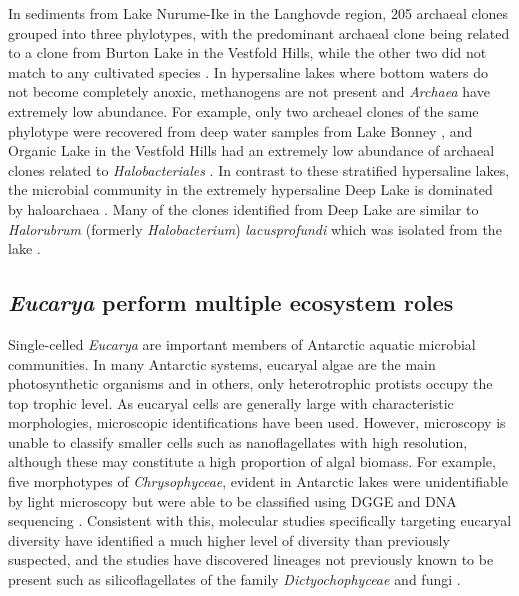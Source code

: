 In sediments from Lake Nurume-Ike in the Langhovde region, 205 archaeal clones grouped into three phylotypes, 
with the predominant archaeal clone being related to a clone from Burton Lake in the Vestfold Hills, while the other two did not match to any cultivated species \cite{Kurosawa2010}. 
In hypersaline lakes where bottom waters do not become completely anoxic, methanogens are not present and \emph{Archaea} have extremely low abundance. 
For example, only two archeael clones of the same phylotype were recovered from deep water samples from Lake Bonney \cite{Glatz2006}, 
and Organic Lake in the Vestfold Hills had an extremely low abundance of archaeal clones related to \emph{Halobacteriales} \cite{Bowman2000b}. 
In contrast to these stratified hypersaline lakes, the microbial community in the extremely hypersaline Deep Lake is dominated by haloarchaea \cite{Bowman2000b}. 
Many of the clones identified from Deep Lake are similar to \emph{Halorubrum} (formerly \emph{Halobacterium}) \emph{lacusprofundi} which was isolated from the lake \cite{Franzmann1988}. 


\subsection{\emph{Eucarya} perform multiple ecosystem roles}

Single-celled \emph{Eucarya} are important members of Antarctic aquatic microbial communities.
In many Antarctic systems, eucaryal algae are the main photosynthetic organisms and in others, only heterotrophic protists occupy the top trophic level. 
As eucaryal cells are generally large with characteristic morphologies, microscopic identifications have been used. 
However, microscopy is unable to classify smaller cells such as nanoflagellates with high resolution, although these may constitute a high proportion of algal biomass.
For example, five morphotypes of \emph{Chrysophyceae}, evident in Antarctic lakes were unidentifiable by light microscopy but were able to be classified using \ac{DGGE} and \textsc{DNA} sequencing \cite{Unrein2005}.
Consistent with this, molecular studies specifically targeting eucaryal diversity \cite{Unrein2005, Mosier2007, Bielewicz2011} have identified a much higher level of diversity than previously suspected,
 and the studies have discovered lineages not previously known to be present such as silicoflagellates of the family \emph{Dictyochophyceae} \cite{Unrein2005} and fungi \cite{Mosier2007, Bielewicz2011}.

